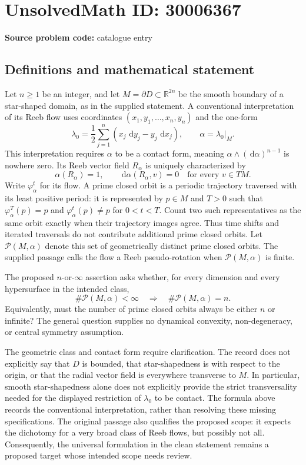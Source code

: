 \documentclass[11pt]{article}
\newcommand{\R}{\mathbb{R}}
\newcommand{\dd}{\,\mathrm{d}}
\begin{document}
\section*{UnsolvedMath ID: 30006367}
\textbf{Source problem code:} catalogue entry
\subsection{Definitions and mathematical statement}
Let \(n\geq 1\) be an integer, and let \(M=\partial D\subset\R^{2n}\) be the smooth boundary of a star-shaped domain, as in the supplied statement. A conventional interpretation of its Reeb flow uses coordinates \((x_1,y_1,\ldots,x_n,y_n)\) and the one-form
\[
\lambda_0=\frac12\sum_{j=1}^n(x_j\,\dd y_j-y_j\,\dd x_j),\qquad \alpha=\lambda_0|_M.
\]
This interpretation requires \(\alpha\) to be a contact form, meaning \(\alpha\wedge(\dd\alpha)^{n-1}\) is nowhere zero. Its Reeb vector field \(R_\alpha\) is uniquely characterized by
\[
\alpha(R_\alpha)=1,\qquad \dd\alpha(R_\alpha,v)=0\quad\text{for every }v\in TM.
\]
Write \(\varphi_\alpha^t\) for its flow. A prime closed orbit is a periodic trajectory traversed with its least positive period: it is represented by \(p\in M\) and \(T>0\) such that \(\varphi_\alpha^T(p)=p\) and \(\varphi_\alpha^t(p)\ne p\) for \(0<t<T\). Count two such representatives as the same orbit exactly when their trajectory images agree. Thus time shifts and iterated traversals do not contribute additional prime closed orbits. Let \(\mathcal P(M,\alpha)\) denote this set of geometrically distinct prime closed orbits. The supplied passage calls the flow a Reeb pseudo-rotation when \(\mathcal P(M,\alpha)\) is finite.

The proposed \(n\)-or-\(\infty\) assertion asks whether, for every dimension and every hypersurface in the intended class,
\[
\#\mathcal P(M,\alpha)<\infty
\quad\Longrightarrow\quad
\#\mathcal P(M,\alpha)=n.
\]
Equivalently, must the number of prime closed orbits always be either \(n\) or infinite? The general question supplies no dynamical convexity, non-degeneracy, or central symmetry assumption.

The geometric class and contact form require clarification. The record does not explicitly say that \(D\) is bounded, that star-shapedness is with respect to the origin, or that the radial vector field is everywhere transverse to \(M\). In particular, smooth star-shapedness alone does not explicitly provide the strict transversality needed for the displayed restriction of \(\lambda_0\) to be contact. The formula above records the conventional interpretation, rather than resolving these missing specifications. The original passage also qualifies the proposed scope: it expects the dichotomy for a very broad class of Reeb flows, but possibly not all. Consequently, the universal formulation in the clean statement remains a proposed target whose intended scope needs review.
\end{document}
